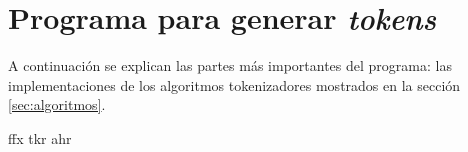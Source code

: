 %
%
%

\section{Programa para generar \textit{tokens}}

A continuación se explican las partes más importantes del programa:
las implementaciones de los algoritmos tokenizadores mostrados en la
sección \ref{sec:algoritmos}.


{ffx}
{tkr}
{ahr}
